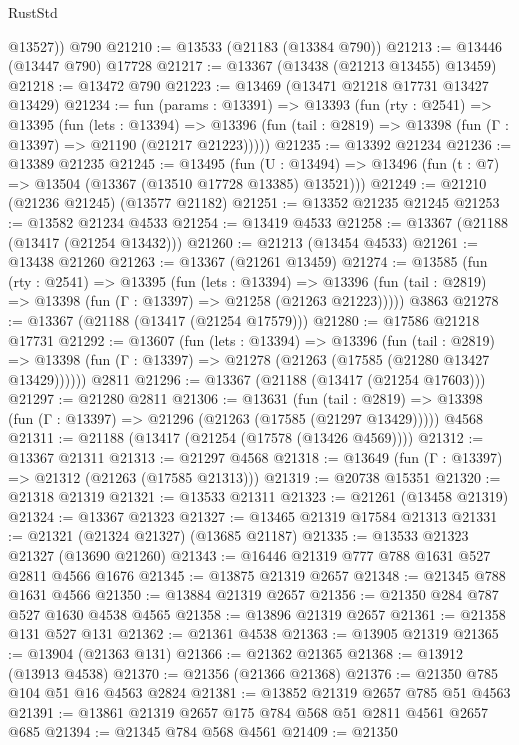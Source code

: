 \begin{lexlean}{RustStd}
\begin{coremodule}
        @13527))
    @790
@21210 := @13533 (@21183 (@13384 @790))
@21213 := @13446 (@13447 @790) @17728
@21217 := @13367 (@13438 (@21213 @13455) @13459)
@21218 := @13472 @790
@21223 := @13469 (@13471 @21218 @17731 @13427 @13429)
@21234 := fun (params : @13391) =>
  @13393
    (fun (rty : @2541) =>
    @13395
      (fun (lets : @13394) =>
      @13396 (fun (tail : @2819) => @13398 (fun (Γ : @13397) => @21190 (@21217 @21223)))))
@21235 := @13392 @21234
@21236 := @13389 @21235
@21245 := @13495
    (fun (U : @13494) => @13496 (fun (t : @7) => @13504 (@13367 (@13510 @17728 @13385) @13521)))
@21249 := @21210 (@21236 @21245) (@13577 @21182)
@21251 := @13352 @21235 @21245
@21253 := @13582 @21234 @4533
@21254 := @13419 @4533
@21258 := @13367 (@21188 (@13417 (@21254 @13432)))
@21260 := @21213 (@13454 @4533)
@21261 := @13438 @21260
@21263 := @13367 (@21261 @13459)
@21274 := @13585
    (fun (rty : @2541) =>
    @13395
      (fun (lets : @13394) =>
      @13396 (fun (tail : @2819) => @13398 (fun (Γ : @13397) => @21258 (@21263 @21223)))))
    @3863
@21278 := @13367 (@21188 (@13417 (@21254 @17579)))
@21280 := @17586 @21218 @17731
@21292 := @13607
    (fun (lets : @13394) =>
    @13396
      (fun (tail : @2819) =>
      @13398 (fun (Γ : @13397) => @21278 (@21263 (@17585 (@21280 @13427 @13429))))))
    @2811
@21296 := @13367 (@21188 (@13417 (@21254 @17603)))
@21297 := @21280 @2811
@21306 := @13631
    (fun (tail : @2819) => @13398 (fun (Γ : @13397) => @21296 (@21263 (@17585 (@21297 @13429)))))
    @4568
@21311 := @21188 (@13417 (@21254 (@17578 (@13426 @4569))))
@21312 := @13367 @21311
@21313 := @21297 @4568
@21318 := @13649 (fun (Γ : @13397) => @21312 (@21263 (@17585 @21313)))
@21319 := @20738 @15351
@21320 := @21318 @21319
@21321 := @13533 @21311
@21323 := @21261 (@13458 @21319)
@21324 := @13367 @21323
@21327 := @13465 @21319 @17584 @21313
@21331 := @21321 (@21324 @21327) (@13685 @21187)
@21335 := @13533 @21323 @21327 (@13690 @21260)
@21343 := @16446 @21319 @777 @788 @1631 @527 @2811 @4566 @1676
@21345 := @13875 @21319 @2657
@21348 := @21345 @788 @1631 @4566
@21350 := @13884 @21319 @2657
@21356 := @21350 @284 @787 @527 @1630 @4538 @4565
@21358 := @13896 @21319 @2657
@21361 := @21358 @131 @527 @131
@21362 := @21361 @4538
@21363 := @13905 @21319
@21365 := @13904 (@21363 @131)
@21366 := @21362 @21365
@21368 := @13912 (@13913 @4538)
@21370 := @21356 (@21366 @21368)
@21376 := @21350 @785 @104 @51 @16 @4563 @2824
@21381 := @13852 @21319 @2657 @785 @51 @4563
@21391 := @13861 @21319 @2657 @175 @784 @568 @51 @2811 @4561 @2657 @685
@21394 := @21345 @784 @568 @4561
@21409 := @21350

\end{coremodule}
\end{lexlean}
